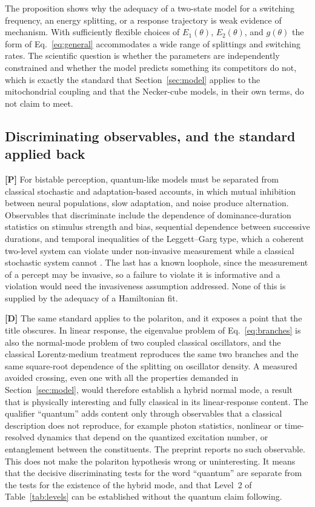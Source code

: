 \documentclass[11pt]{article}
\newcommand{\stD}{\textbf{\textcolor{green!40!black}{[D]}}}
\newcommand{\stP}{\textbf{\textcolor{violet!80!black}{[P]}}}
\theoremstyle{plain}
\theoremstyle{definition}
\theoremstyle{remark}
\begin{document}
The proposition shows why the adequacy of a two-state model for a switching frequency, an energy splitting, or a response trajectory is weak evidence of mechanism. With sufficiently flexible choices of $E_1(\theta)$, $E_2(\theta)$, and $g(\theta)$ the form of Eq.~\eqref{eq:general} accommodates a wide range of splittings and switching rates. The scientific question is whether the parameters are independently constrained and whether the model predicts something its competitors do not, which is exactly the standard that Section~\ref{sec:model} applies to the mitochondrial coupling and that the Necker-cube models, in their own terms, do not claim to meet.

\subsection{Discriminating observables, and the standard applied back}

\stP{} For bistable perception, quantum-like models must be separated from classical stochastic and adaptation-based accounts, in which mutual inhibition between neural populations, slow adaptation, and noise produce alternation. Observables that discriminate include the dependence of dominance-duration statistics on stimulus strength and bias, sequential dependence between successive durations, and temporal inequalities of the Leggett--Garg type, which a coherent two-level system can violate under non-invasive measurement while a classical stochastic system cannot \cite{leggett1985}. The last has a known loophole, since the measurement of a percept may be invasive, so a failure to violate it is informative and a violation would need the invasiveness assumption addressed. None of this is supplied by the adequacy of a Hamiltonian fit.

\stD{} The same standard applies to the polariton, and it exposes a point that the title obscures. In linear response, the eigenvalue problem of Eq.~\eqref{eq:branches} is also the normal-mode problem of two coupled classical oscillators, and the classical Lorentz-medium treatment reproduces the same two branches and the same square-root dependence of the splitting on oscillator density. A measured avoided crossing, even one with all the properties demanded in Section~\ref{sec:model}, would therefore establish a hybrid normal mode, a result that is physically interesting and fully classical in its linear-response content. The qualifier ``quantum'' adds content only through observables that a classical description does not reproduce, for example photon statistics, nonlinear or time-resolved dynamics that depend on the quantized excitation number, or entanglement between the constituents. The preprint reports no such observable. This does not make the polariton hypothesis wrong or uninteresting. It means that the decisive discriminating tests for the word ``quantum'' are separate from the tests for the existence of the hybrid mode, and that Level~2 of Table~\ref{tab:levels} can be established without the quantum claim following.
\end{document}
